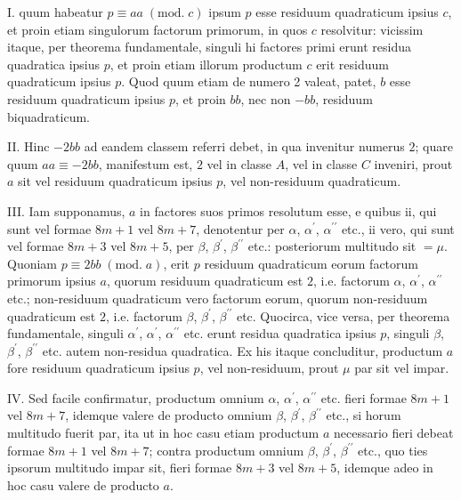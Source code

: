 \documentclass[twoside,12pt]{memoir}
\renewcommand{\pmod}[1]{\;(\textrm{mod.}\;#1)}
\begin{document}
I. quum habeatur \(p \equiv a a \pmod{{c}}\) ipsum \(p\) esse residuum quadraticum ipsius \(c\), et proin etiam singulorum factorum primorum, in quos \(c\) resolvitur: vicissim itaque, per theorema fundamentale, singuli hi factores primi erunt residua quadratica ipsius \(p\), et proin etiam illorum productum \(c\) erit residuum quadraticum ipsius \(p\). Quod quum etiam de numero 2 valeat, patet, \(b\) esse residuum quadraticum ipsius \(p\), et proin \(b b\), nec non \(-b b\), residuum biquadraticum.
 
II. Hinc \(-2 b b\) ad eandem classem referri debet, in qua invenitur numerus \(2\); quare quum \(a a \equiv-2 b b\), manifestum est, \(2\) vel in classe \(A\), vel in classe \(C\) inveniri, prout \(a\) sit vel residuum quadraticum ipsius \(p\), vel non-residuum quadraticum.
 
III. Iam supponamus, \(a\) in factores suos primos resolutum esse, e quibus ii, qui sunt vel formae \(8 m+1\) vel \(8 m+7\), denotentur per \(\alpha\), \(\alpha^{\prime}\), \(\alpha^{\prime \prime}\) etc., ii vero, qui sunt vel formae \(8 m+3\) vel \(8 m+5\), per \(\beta\), \(\beta^{\prime}\), \(\beta^{\prime \prime}\) etc.: posteriorum multitudo sit \(=\mu\). Quoniam \(p \equiv 2 b b \pmod{a}\), erit \(p\) residuum quadraticum eorum factorum primorum ipsius \(a\), quorum residuum quadraticum est \(2\), i.e. factorum \(\alpha\), \(\alpha^{\prime}\), \(\alpha^{\prime \prime}\) etc.; non-residuum quadraticum vero factorum eorum, quorum non-residuum quadraticum est \(2\), i.e. factorum \(\beta\), \(\beta^{\prime}\), \(\beta^{\prime \prime}\) etc. Quocirca, vice versa, per theorema fundamentale, singuli \(\alpha^{\prime}\), \(\alpha^{\prime}\), \(\alpha^{\prime \prime}\) etc. erunt residua quadratica ipsius \(p\), singuli \(\beta\), \(\beta^{\prime}\), \(\beta^{\prime \prime}\) etc. autem non-residua quadratica. Ex his itaque concluditur, productum \(a\) fore residuum quadraticum ipsius \(p\), vel non-residuum, prout \(\mu\) par sit vel impar.
 
IV. Sed facile confirmatur, productum omnium \(\alpha\), \(\alpha^{\prime}\), \(\alpha^{\prime \prime}\) etc. fieri formae \(8 m+1\) vel \(8 m+7\), idemque valere de producto omnium \(\beta\), \(\beta^{\prime}\), \(\beta^{\prime \prime}\) etc., si horum multitudo fuerit par, ita ut in hoc casu etiam productum \(a\) necessario fieri debeat formae \(8 m+1\) vel \(8 m+7\); contra productum omnium \(\beta\), \(\beta^{\prime}\), \(\beta^{\prime \prime}\) etc., quo\pagebreak%
ties ipsorum multitudo impar sit, fieri formae \(8 m+3\) vel \(8 m+5\), idemque adeo in hoc casu valere de producto \(a\).
\end{document}
